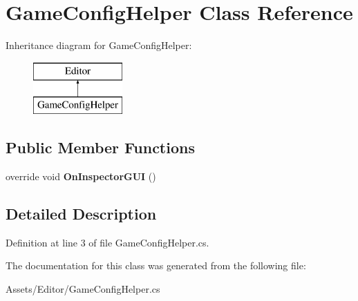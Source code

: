 \hypertarget{class_game_config_helper}{\section{Game\+Config\+Helper Class Reference}
\label{class_game_config_helper}
}
Inheritance diagram for Game\+Config\+Helper\+:\begin{figure}[H]
\begin{center}
\leavevmode
\includegraphics[height=2.000000cm]{class_game_config_helper}
\end{center}
\end{figure}
\subsection*{Public Member Functions}
\begin{DoxyCompactItemize}
\item 
\hypertarget{class_game_config_helper_ae33d5ac411682ea247a5bef30c84fa2e}{override void {\bfseries On\+Inspector\+G\+U\+I} ()}\label{class_game_config_helper_ae33d5ac411682ea247a5bef30c84fa2e}

\end{DoxyCompactItemize}


\subsection{Detailed Description}


Definition at line 3 of file Game\+Config\+Helper.\+cs.



The documentation for this class was generated from the following file\+:\begin{DoxyCompactItemize}
\item 
Assets/\+Editor/Game\+Config\+Helper.\+cs\end{DoxyCompactItemize}
